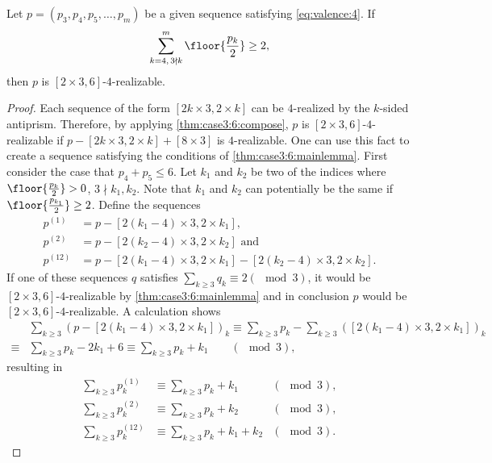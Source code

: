 \begin{theorem}\label{thm:case3:6:main}
  Let $p = (p_3, p_4, p_5, \dots, p_m)$ be a given sequence satisfying \autoref{eq:valence:4}. If
  \begin{align*}
    \sum_{k=4,\, 3 \nmid k}^m \floor{\frac{p_k}{2}} \geq 2,
  \end{align*}
  then $p$ is $[2 \times 3, 6]$-$4$-realizable.
  \begin{proof}
    Each sequence of the form $[2k \times 3, 2 \times k]$ can be $4$-realized by the $k$-sided antiprism. Therefore, by applying \autoref{thm:case3:6:compose}, $p$ is $[2 \times 3, 6]$-$4$-realizable if $p - [2k \times 3, 2 \times k] + [8 \times 3]$ is $4$-realizable. One can use this fact to create a sequence satisfying the conditions of \autoref{thm:case3:6:mainlemma}. First consider the case that $p_4 + p_5 \leq 6$. Let $k_1$ and $k_2$  be two of the indices where $\floor{\frac{p_k}{2}} > 0$, $3 \nmid k_1, k_2$. Note that $k_1$ and $k_2$ can potentially be the same if $\floor{\frac{p_{k_1}}{2}} \geq 2$. Define the sequences
    \begin{align*}
      p^{(1)} &= p - [2(k_1 - 4) \times 3, 2 \times k_1], \\
      p^{(2)} &= p - [2(k_2 - 4) \times 3, 2 \times k_2] \text{ and } \\
      p^{(12)} &= p - [2(k_1 - 4) \times 3, 2 \times k_1] - [2(k_2 - 4) \times 3, 2 \times k_2].
    \end{align*}
    If one of these sequences $q$ satisfies $\sum_{k\geq 3} q_k \equiv 2 (\mod 3)$, it would be $[2 \times 3, 6]$-$4$-realizable by \autoref{thm:case3:6:mainlemma} and in conclusion $p$ would be $[2 \times 3, 6]$-$4$-realizable. A calculation shows
    \begin{align*}
      &\sum_{k\geq 3} (p - [2(k_1 - 4) \times 3, 2 \times k_1])_k  \equiv \sum_{k\geq 3} p_k - \sum_{k\geq 3} ([2(k_1 - 4) \times 3, 2 \times k_1])_k \\
      \equiv& \sum_{k\geq 3} p_k - 2k_1 + 6 \equiv \sum_{k\geq 3} p_k + k_1 \qquad (\mod 3),
    \end{align*}
    resulting in
    \begin{align*}
      \sum_{k\geq 3} p^{(1)}_k  &\equiv \sum_{k\geq 3} p_k + k_1  & (\mod 3), \\
      \sum_{k\geq 3} p^{(2)}_k  &\equiv \sum_{k\geq 3} p_k + k_2  & (\mod 3), \\
      \sum_{k\geq 3} p^{(12)}_k  &\equiv \sum_{k\geq 3} p_k + k_1 + k_2  & (\mod 3).
    \end{align*}

\end{proof}
\end{theorem}
